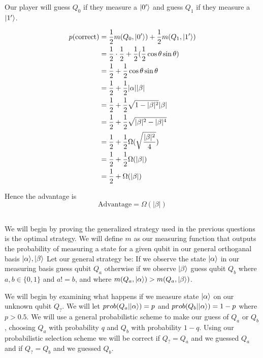 Our player will guess $Q_0$ if they measure a $\lvert0'\rangle$ and guess $Q_1$ if they measure a $\lvert1'\rangle$.

\begin{align*}
    p(\text{correct}) &= \frac{1}{2} m(Q_0, \lvert0'\rangle) + \frac{1}{2} m(Q_1, \lvert1'\rangle)\\
     &= \frac{1}{2}\cdot \frac{1}{2} + \frac{1}{2} (\frac{1}{2} \cos\theta \sin\theta)\\
     &= \frac{1}{2} + \frac{1}{2} \cos\theta \sin\theta\\
     &= \frac{1}{2} + \frac{1}{2} |\alpha| |\beta|\\
     &= \frac{1}{2} + \frac{1}{2} \sqrt{1-|\beta|^2} |\beta|\\
     &= \frac{1}{2} + \frac{1}{2} \sqrt{|\beta|^2-|\beta|^4}\\
     &= \frac{1}{2} + \frac{1}{2} \Omega(\sqrt{\frac{|\beta|^2}{4}})\\
     &= \frac{1}{2} + \frac{1}{2} \Omega(|\beta|)\\
     &= \frac{1}{2} + \Omega(|\beta|)\\
\end{align*}

Hence the advantage is
\[
    \text{Advantage}=\Omega(|\beta|)
\]



\subsection{}
We will begin by proving the generalized strategy used in the previous questions is the optimal strategy.
We will define $m$ as our measuring function that outputs the probability of measuring a state for a given qubit in our general orthoganal basis $\lvert\alpha\rangle, \lvert\beta\rangle$ 
Let our general strategy be: If we observe the state $\lvert\alpha\rangle$ in our measuring basis guess qubit $Q_a$ otherwise if we observe $\lvert\beta\rangle$ guess qubit $Q_b$ where $a,b\in\{0,1\}$ and $a!=b$, and where $m(Q_a, \lvert\alpha\rangle)>m(Q_a, \lvert\beta\rangle)$.

We will begin by examining what happens if we measure state $\lvert\alpha\rangle$ on our unknown qubit $Q_?$.
We will let $prob(Q_a|\lvert\alpha\rangle)=p$ and $prob(Q_b| \lvert\alpha\rangle)=1-p$ where $p>0.5$.
We will use a general probabilistic scheme to make our guess of $Q_a$ or $Q_b$, choosing $Q_a$ with probability $q$ and $Q_b$ with probability $1-q$.
Using our probabilistic selection scheme we will be correct if $Q_?=Q_a$ and we guessed $Q_a$ and if $Q_?=Q_b$ and we guessed $Q_b$.


